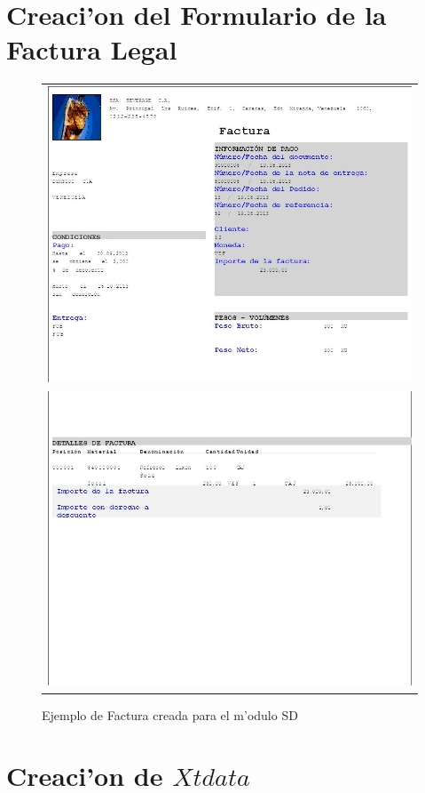 \section{Creaci'on del Formulario de la Factura Legal}
\begin{figure}[H]
\centering
\begin{tabular}{c}
\includegraphics[scale=0.65,type=jpg,ext=.jpg,read=.jpg]{figures/Factura1}\\
\includegraphics[scale=0.65,type=jpg,ext=.jpg,read=.jpg]{figures/Factura2}\\
\end{tabular}
\caption{Ejemplo de Factura creada para el m'odulo SD}
\label{fig:facturas}
\end{figure}

\section{Creaci'on de $Xtdata$}





